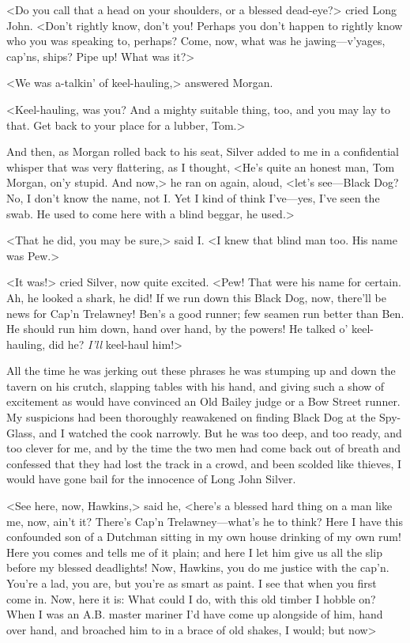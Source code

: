 <Do you call that a head on your shoulders, or a blessed dead-eye?> cried Long John. <Don't rightly know, don't you! Perhaps you don't happen to rightly know who you was speaking to, perhaps? Come, now, what was he jawing—v'yages, cap'ns, ships? Pipe up! What was it?>

<We was a-talkin' of keel-hauling,> answered Morgan.

<Keel-hauling, was you? And a mighty suitable thing, too, and you may lay to that. Get back to your place for a lubber, Tom.>

And then, as Morgan rolled back to his seat, Silver added to me in a confidential whisper that was very flattering, as I thought, <He's quite an honest man, Tom Morgan, on'y stupid. And now,> he ran on again, aloud, <let's see—Black Dog? No, I don't know the name, not I\@. Yet I kind of think I've—yes, I've seen the swab. He used to come here with a blind beggar, he used.>

<That he did, you may be sure,> said I\@. <I knew that blind man too. His name was Pew.>

<It was!> cried Silver, now quite excited. <Pew! That were his name for certain. Ah, he looked a shark, he did! If we run down this Black Dog, now, there'll be news for Cap'n Trelawney! Ben's a good runner; few seamen run better than Ben. He should run him down, hand over hand, by the powers! He talked o' keel-hauling, did he? \textit{I'll} keel-haul him!>

All the time he was jerking out these phrases he was stumping up and down the tavern on his crutch, slapping tables with his hand, and giving such a show of excitement as would have convinced an Old Bailey judge or a Bow Street runner. My suspicions had been thoroughly reawakened on finding Black Dog at the Spy-Glass, and I watched the cook narrowly. But he was too deep, and too ready, and too clever for me, and by the time the two men had come back out of breath and confessed that they had lost the track in a crowd, and been scolded like thieves, I would have gone bail for the innocence of Long John Silver.

<See here, now, Hawkins,> said he, <here's a blessed hard thing on a man like me, now, ain't it? There's Cap'n Trelawney—what's he to think? Here I have this confounded son of a Dutchman sitting in my own house drinking of my own rum! Here you comes and tells me of it plain; and here I let him give us all the slip before my blessed deadlights! Now, Hawkins, you do me justice with the cap'n. You're a lad, you are, but you're as smart as paint. I see that when you first come in. Now, here it is: What could I do, with this old timber I hobble on? When I was an A\@.B\@. master mariner I'd have come up alongside of him, hand over hand, and broached him to in a brace of old shakes, I would; but now\longdash>

